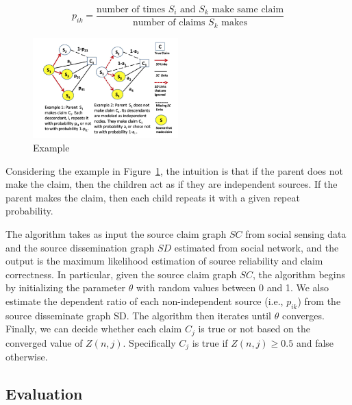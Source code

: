 \documentclass[a4paper,12pt]{article}
\begin{document}
$$ p_{ik} = \frac{\text{number of times } S_i \text{ and } S_k \text{ make same claim}}{\text{number of claims } S_k \text{ makes}} $$

\begin{figure}[t!]
  \centering
  \includegraphics[width=0.5\textwidth]{img/mle}
  \caption{\label{fig:mle} Example}
\end{figure}

Considering the example in Figure~\ref{fig:mle}, the intuition is that if the parent does not make the claim, then the children act as if they are independent sources. If the parent makes the claim, then each child repeats it with a given repeat probability.

The algorithm takes as input the source claim graph $SC$ from social sensing data and the source dissemination graph $SD$ estimated from social network, and the output is the maximum likelihood estimation of source reliability and claim correctness. In particular, given the source claim graph $SC$, the algorithm begins by initializing the parameter $\theta$ with random values between 0 and 1. We also estimate the dependent ratio of each non-independent source (i.e., $p_{ik}$) from the source disseminate graph SD. The algorithm then iterates until $\theta$ converges. Finally, we can decide whether each claim $C_j$ is true or not based on the converged value of $Z(n,j)$. Specifically $C_j$ is true if $Z(n,j) \ge 0.5$ and false otherwise. 

\subsection{Evaluation}
\end{document}
